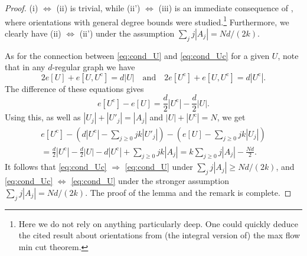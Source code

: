\documentclass[12pt]{amsart}
\newtheorem{corollary}[theorem]{Corollary}
\theoremstyle{definition}
\newcommand\comp{\mathrm{c}}
\newcommand\al{\alpha}
\begin{document}
\begin{proof}
(i) $\Leftrightarrow$ (ii) is trivial, while (ii') $\Leftrightarrow$ (iii) is an immediate consequence of \cite[Theorem 1]{frank1976orien}, where orientations with general degree bounds were studied.\footnote{Here we do not rely on anything particularly deep. One could quickly deduce the cited result about orientations from (the integral version of) the max flow min cut theorem.} Furthermore, we clearly have (ii) $\Leftrightarrow$ (ii') under the assumption $\sum_j j |A_j| = Nd/(2k)$.

As for the connection between \eqref{eq:cond_U} and \eqref{eq:cond_Uc} for a given $U$, note that in any $d$-regular graph we have 
%
\[ 2e[U] + e[U,U^\comp] = d |U| 
\quad \text{and} \quad 
2e[U^\comp] + e[U,U^\comp] = d |U^\comp| .\]
%
The difference of these equations gives 
%
\[ e[U^\comp]-e[U] = \frac{d}{2}|U^\comp|-\frac{d}{2}|U| .\]
%
Using this, as well as $|U_j|+|U'_j|=|A_j|$ and $|U|+|U^\comp|=N$, we get 
%
\begin{multline*}
e[U^\comp] 
- \left( d |U^\comp| - \sum_{j \geq 0} jk |U'_j| \right) 
- \left( e[U] - \sum_{j \geq 0} jk |U_j| \right) \\
= \frac{d}{2}|U^\comp|-\frac{d}{2}|U| - d|U^\comp| 
+ \sum_{j \geq 0} jk |A_j| 
= k \sum_{j \geq 0} j |A_j| - \frac{Nd}{2} .
\end{multline*}
%
It follows that \eqref{eq:cond_Uc} $\Rightarrow$ \eqref{eq:cond_U} under $\sum_j j |A_j| \geq Nd/(2k)$, and \eqref{eq:cond_Uc} $\Leftrightarrow$ \eqref{eq:cond_U} under the stronger assumption $\sum_j j |A_j| = Nd/(2k)$. The proof of the lemma and the remark is complete.
\end{proof}
%

\end{document}
